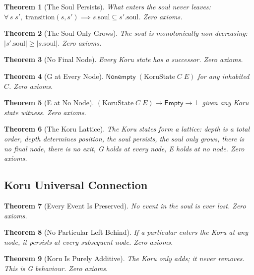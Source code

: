\documentclass[11pt,a4paper]{article}
\newtheorem{theorem}{Theorem}[section]
\theoremstyle{definition}
\theoremstyle{remark}
\newcommand{\AbsEnder}[1]{#1 \to \mathsf{Empty}}
\newcommand{\Something}[1]{\mathsf{Nonempty}\;#1}
\begin{document}
\begin{theorem}[The Soul Persists]
What enters the soul never leaves: $\forall\, s\; s',\; \text{transition}(s, s') \implies s.\text{soul} \subseteq s'.\text{soul}$. Zero axioms.
\end{theorem}

\begin{theorem}[The Soul Only Grows]
The soul is monotonically non-decreasing: $|s'.\text{soul}| \ge |s.\text{soul}|$. Zero axioms.
\end{theorem}

\begin{theorem}[No Final Node]
Every Koru state has a successor. Zero axioms.
\end{theorem}

\begin{theorem}[G at Every Node]
$\Something{(\text{KoruState}\;C\;E)}$ for any inhabited $C$. Zero axioms.
\end{theorem}

\begin{theorem}[E at No Node]
$\AbsEnder{(\text{KoruState}\;C\;E)} \to \bot$ given any Koru state witness. Zero axioms.
\end{theorem}

\begin{theorem}[The Koru Lattice]
The Koru states form a lattice: depth is a total order, depth determines position, the soul persists, the soul only grows, there is no final node, there is no exit, G holds at every node, E holds at no node. Zero axioms.
\end{theorem}

\subsection{Koru Universal Connection}

\begin{theorem}[Every Event Is Preserved]
No event in the soul is ever lost. Zero axioms.
\end{theorem}

\begin{theorem}[No Particular Left Behind]
If a particular enters the Koru at any node, it persists at every subsequent node. Zero axioms.
\end{theorem}

\begin{theorem}[Koru Is Purely Additive]
The Koru only adds; it never removes. This is G behaviour. Zero axioms.
\end{theorem}
\end{document}
